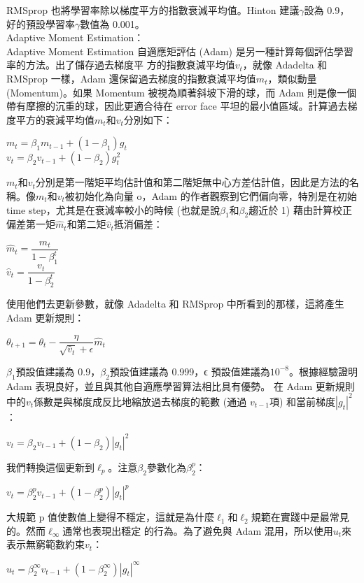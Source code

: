 \begin{itemize}
 RMSprop 也將學習率除以梯度平方的指數衰減平均值。Hinton 建議$\gamma$設為 0.9，好的預設學習率$\gamma$數值為 0.001。\\
Adaptive Moment Estimation：\\
 Adaptive Moment Estimation 自適應矩評估 (Adam) 是另一種計算每個評估學習率的方法。出了儲存過去梯度平 方的指數衰減平均值$v_t$，就像 Adadelta 和 RMSprop 一樣，Adam 還保留過去梯度的指數衰減平均值$m_t$，類似動量 (Momentum)。如果 Momentum 被視為順著斜坡下滑的球，而 Adam 則是像一個帶有摩擦的沉重的球，因此更適合待在 error face 平坦的最小值區域。計算過去梯度平方的衰減平均值$m_t$和$v_t$分別如下：
\begin{center}
$m_t=\beta_1 m_{t-1}+(1-\beta_1)g_t$\\
$v_t=\beta_2 v_{t-1}+(1-\beta_2)g^2 _t$
\end{center}
$m_t$和$v_t$分別是第一階矩平均估計值和第二階矩無中心方差估計值，因此是方法的名稱。像$m_t$和$v_t$被初始化為向量 o，Adam 的作者觀察到它們偏向零，特別是在初始 time step，尤其是在衰減率較小的時候 (也就是說$\beta_1$和$\beta_2$趨近於 1) 藉由計算校正偏差第一矩$\hat{m}_t$和第二矩$\hat{v}_t$抵消偏差：
\begin{center}
$\hat{m}_t = \dfrac{m_t}{1 - \beta^t_1}$\\
$\hat{v}_t = \dfrac{v_t}{1 - \beta^t_2}$
\end{center}
使用他們去更新參數，就像 Adadelta 和 RMSprop 中所看到的那樣，這將產生 Adam 更新規則：
\begin{center}
$\theta_{t+1} = \theta_{t} - \dfrac{\eta}{\sqrt{\hat{v}_t} + \epsilon} \hat{m}_t$
\end{center}
$\beta_1$預設值建議為 0.9，$\beta_2$預設值建議為 0.999，ϵ 預設值建議為$10^{-8}$。根據經驗證明 Adam 表現良好，並且與其他自適應學習算法相比具有優勢。
在 Adam 更新規則中的$v_t$係數是與梯度成反比地縮放過去梯度的範數 (通過 $v_{t-1}$項) 和當前梯度$|g_t|^2$：
\begin{center}
$v_t = \beta_2 v_{t-1} + (1 - \beta_2) |g_t|^2$
\end{center}
我們轉換這個更新到$\ell_p$。注意$\beta_2$參數化為$\beta_2^p$：
\begin{center}
$v_t = \beta_2^p v_{t-1} + (1 - \beta_2^p) |g_t|^p$
\end{center}
大規範 p 值使數值上變得不穩定，這就是為什麼$\ell_1$和$\ell_2$規範在實踐中是最常見的。然而$\ell_\infty$通常也表現出穩定 的行為。為了避免與 Adam 混用，所以使用$u_t$來表示無窮範數約束$v_t$：
\begin{center}
$u_t = \beta_2^\infty v_{t-1} + (1 - \beta_2^\infty) |g_t|^\infty$\\

\end{center}
\end{itemize}
